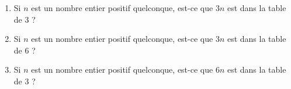 
\begin{exercice}\label{exosmath-0939}

    \begin{enumerate}
        \item
            Si \( n\) est un nombre entier positif quelconque, est-ce que \( 3n\) est dans la table de \( 3\) ?
        \item
            Si \( n\) est un nombre entier positif quelconque, est-ce que \( 3n\) est dans la table de \( 6\) ?
        \item
            Si \( n\) est un nombre entier positif quelconque, est-ce que \( 6n\) est dans la table de \( 3\) ?
    \end{enumerate}

\end{exercice}
